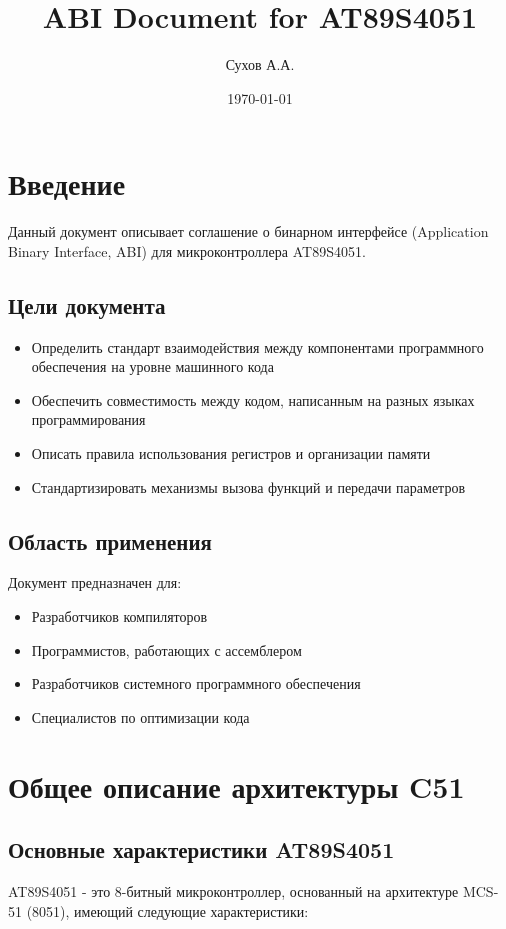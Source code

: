 \documentclass[a4paper, 12pt]{article}
\title{ABI Document for AT89S4051}
\author{Сухов А.А.}
\date{\today}
\begin{document}
\maketitle

\tableofcontents

\section{Введение}
Данный документ описывает соглашение о бинарном интерфейсе (Application Binary Interface, ABI) для микроконтроллера AT89S4051. 

\subsection{Цели документа}
\begin{itemize}
    \item Определить стандарт взаимодействия между компонентами программного обеспечения на уровне машинного кода
    \item Обеспечить совместимость между кодом, написанным на разных языках программирования
    \item Описать правила использования регистров и организации памяти
    \item Стандартизировать механизмы вызова функций и передачи параметров
\end{itemize}

\subsection{Область применения}
Документ предназначен для:
\begin{itemize}
    \item Разработчиков компиляторов
    \item Программистов, работающих с ассемблером
    \item Разработчиков системного программного обеспечения
    \item Специалистов по оптимизации кода
\end{itemize}

\section{Общее описание архитектуры C51}
\subsection{Основные характеристики AT89S4051}
AT89S4051 - это 8-битный микроконтроллер, основанный на архитектуре MCS-51 (8051), имеющий следующие характеристики:
\end{document}
